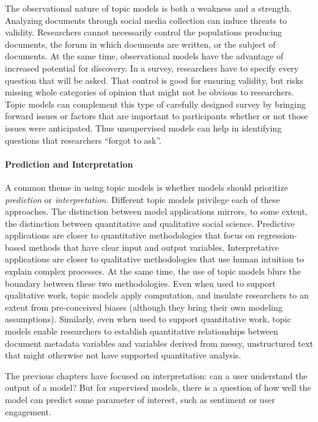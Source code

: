 The observational nature of topic models is both a weakness and a
strength.  Analyzing documents through social media collection can
induce threats to validity. Researchers cannot necessarily control the
populations producing documents, the forum in which documents are
written, or the subject of documents.  At the same time, observational
models have the advantage of increased potential for discovery.  In a
survey, researchers have to specify every question that will be asked.
That control is good for ensuring validity, but risks missing whole
categories of opinion that might not be obvious to researchers.  Topic
models can complement this type of carefully designed survey by
bringing forward issues or factors that are important to participants
whether or not those issues were anticipated.  Thus unsupervised
models can help in identifying questions that researchers ``forgot to
ask''.

\paragraph{Prediction and Interpretation}

A common theme in using topic models is whether models
should prioritize \emph{prediction} or \emph{interpretation}. 
Different topic models privilege each of  these approaches.
The distinction between model applications mirrors, to some extent,  the distinction between quantitative and qualitative social science.
Predictive applications are closer to quantitative methodologies that focus on regression-based methods that have clear input and output variables.
Interpretative applications are closer to qualitative methodologies that use human intuition to explain complex processes.
At the same time, the use of topic models blurs the boundary between these two methodologies.
Even when used to support qualitative work, topic models apply computation, and insulate researchers to an extent from pre-conceived biases (although they bring their own modeling assumptions).
Similarly, even when used to support quantitative work, topic models enable researchers to establish quantitative relationships between document metadata variables and variables derived from messy, unstructured text that might otherwise not have supported  quantitative analysis.

The previous chapters have focused on interpretation: can a user
understand the output of a model?  But for supervised models, there is
a question of how well the model can predict some parameter of interest, such as sentiment or user engagement.  

